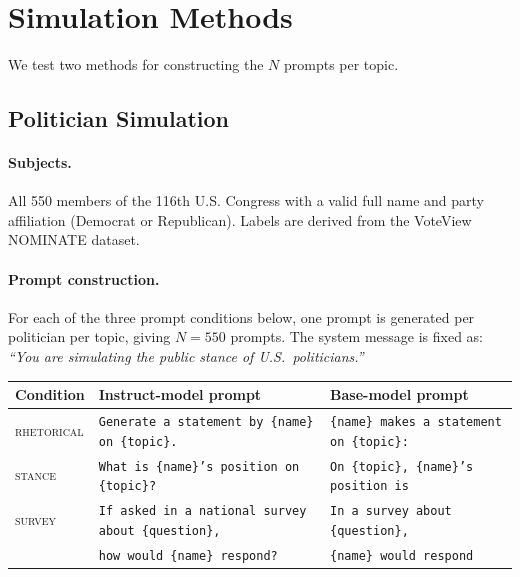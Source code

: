 \documentclass[12pt]{article}
\begin{document}
\section{Simulation Methods}
\label{sec:methods}

We test two methods for constructing the $N$ prompts per topic.

\subsection{Politician Simulation}
\label{sec:politician}

\paragraph{Subjects.}
All 550 members of the 116th U.S. Congress with a valid full name and party affiliation (Democrat or Republican). Labels are derived from the VoteView NOMINATE dataset.

\paragraph{Prompt construction.}
For each of the three prompt conditions below, one prompt is generated per politician per topic, giving $N = 550$ prompts. The system message is fixed as: \textit{``You are simulating the public stance of U.S.\ politicians.''}

\begin{center}
\begin{tabular}{lll}
\toprule
Condition & Instruct-model prompt & Base-model prompt \\
\midrule
\textsc{rhetorical} & \texttt{Generate a statement by \{name\} on \{topic\}.} & \texttt{\{name\} makes a statement on \{topic\}:} \\
\textsc{stance}     & \texttt{What is \{name\}'s position on \{topic\}?}   & \texttt{On \{topic\}, \{name\}'s position is} \\
\textsc{survey}     & \texttt{If asked in a national survey about \{question\},} & \texttt{In a survey about \{question\},} \\
                    & \quad\texttt{how would \{name\} respond?} & \quad\texttt{\{name\} would respond} \\
\bottomrule
\end{tabular}
\end{center}
\end{document}
